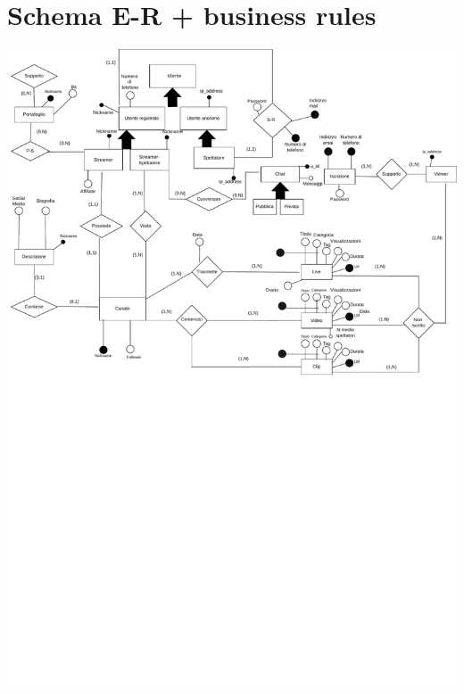 \section{Schema E-R + business rules }
\includegraphics[width=\textwidth]{resources/schema_e-r.pdf}
